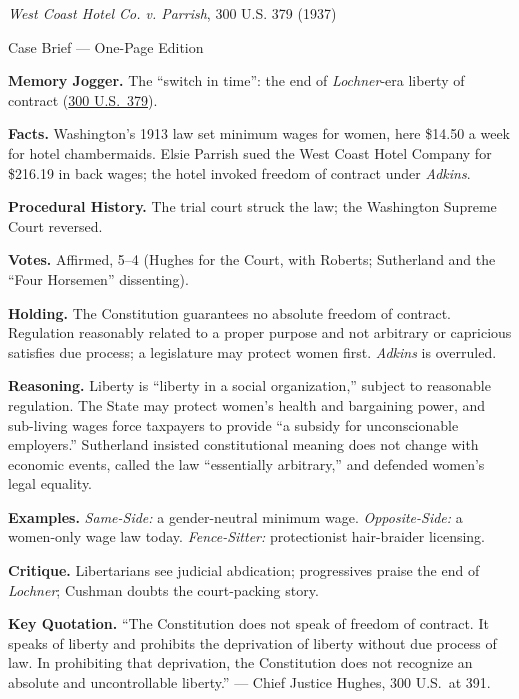 \documentclass[12pt]{article}
\begin{document}
\begin{center}
{\Large \textit{West Coast Hotel Co. v. Parrish}, 300 U.S. 379 (1937)\par}
\vspace{0.3em}
{\normalsize Case Brief --- One-Page Edition\par}
\end{center}

\textbf{Memory Jogger.} The ``switch in time'': the end of \textit{Lochner}-era liberty of contract (\href{https://supreme.justia.com/cases/federal/us/300/379/}{300 U.S.\ 379}).

\textbf{Facts.} Washington's 1913 law set minimum wages for women, here \$14.50 a week for hotel chambermaids. Elsie Parrish sued the West Coast Hotel Company for \$216.19 in back wages; the hotel invoked freedom of contract under \textit{Adkins}.

\textbf{Procedural History.} The trial court struck the law; the Washington Supreme Court reversed.

\textbf{Votes.} Affirmed, 5--4 (Hughes for the Court, with Roberts; Sutherland and the ``Four Horsemen'' dissenting).

\textbf{Holding.} The Constitution guarantees no absolute freedom of contract. Regulation reasonably related to a proper purpose and not arbitrary or capricious satisfies due process; a legislature may protect women first. \textit{Adkins} is overruled.

\textbf{Reasoning.} Liberty is ``liberty in a social organization,'' subject to reasonable regulation. The State may protect women's health and bargaining power, and sub-living wages force taxpayers to provide ``a subsidy for unconscionable employers.'' Sutherland insisted constitutional meaning does not change with economic events, called the law ``essentially arbitrary,'' and defended women's legal equality.

\textbf{Examples.} \emph{Same-Side:} a gender-neutral minimum wage. \emph{Opposite-Side:} a women-only wage law today. \emph{Fence-Sitter:} protectionist hair-braider licensing.

\textbf{Critique.} Libertarians see judicial abdication; progressives praise the end of \textit{Lochner}; Cushman doubts the court-packing story.

\textbf{Key Quotation.} ``The Constitution does not speak of freedom of contract. It speaks of liberty and prohibits the deprivation of liberty without due process of law. In prohibiting that deprivation, the Constitution does not recognize an absolute and uncontrollable liberty.'' --- Chief Justice Hughes, 300 U.S.\ at 391.
\end{document}
